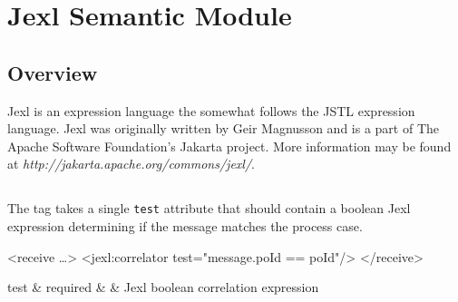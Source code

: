 \chapter{Jexl Semantic Module}

\section{Overview}

Jexl is an expression language the somewhat follows the JSTL
expression language.  Jexl was originally written by Geir
Magnusson and is a part of The Apache Software Foundation's 
Jakarta project.  More information may be found at
\emph{http://jakarta.apache.org/commons/jexl/}.

\section{}

The  tag takes a single \verb|test| attribute
that should contain a boolean Jexl expression determining if
the message matches the process case.

\begin{codelisting}
<receive \dots>
    <jexl:correlator test="message.poId == poId"/>
</receive>
\end{codelisting}

\begin{attrDefs}
test		&	required	&			& Jexl boolean correlation expression \\
\end{attrDefs}
